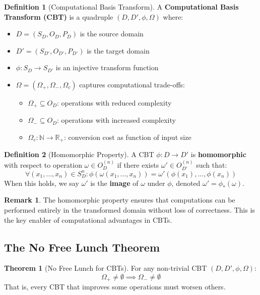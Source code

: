 \documentclass[12pt,a4paper]{article}
\theoremstyle{definition}
\newtheorem{definition}{Definition}
\newtheorem{theorem}{Theorem}
\newtheorem{remark}{Remark}
\begin{document}
\begin{definition}[Computational Basis Transform]
\label{def:cbt}
A \textbf{Computational Basis Transform (CBT)} is a quadruple $(D, D', \phi, \Omega)$ where:
\begin{itemize}
\item $D = (S_D, O_D, P_D)$ is the source domain
\item $D' = (S_{D'}, O_{D'}, P_{D'})$ is the target domain
\item $\phi: S_D \to S_{D'}$ is an injective transform function
\item $\Omega = (\Omega_+, \Omega_-, \Omega_c)$ captures computational trade-offs:
  \begin{itemize}
  \item $\Omega_+ \subseteq O_D$: operations with reduced complexity
  \item $\Omega_- \subseteq O_D$: operations with increased complexity
  \item $\Omega_c: \mathbb{N} \to \mathbb{R}_+$: conversion cost as function of input size
  \end{itemize}
\end{itemize}
\end{definition}

\begin{definition}[Homomorphic Property]
A CBT $\phi: D \to D'$ is \textbf{homomorphic} with respect to operation $\omega \in O_D^{(n)}$ if there exists $\omega' \in O_{D'}^{(n)}$ such that:
\begin{equation}
\forall (x_1, \ldots, x_n) \in S_D^n: \phi(\omega(x_1, \ldots, x_n)) = \omega'(\phi(x_1), \ldots, \phi(x_n))
\end{equation}
When this holds, we say $\omega'$ is the \textbf{image} of $\omega$ under $\phi$, denoted $\omega' = \phi_*(\omega)$.
\end{definition}

\begin{remark}
The homomorphic property ensures that computations can be performed entirely in the transformed domain without loss of correctness. This is the key enabler of computational advantages in CBTs.
\end{remark}

\subsection{The No Free Lunch Theorem}

\begin{theorem}[No Free Lunch for CBTs]
\label{thm:nfl}
For any non-trivial CBT $(D, D', \phi, \Omega)$:
\begin{equation}
\Omega_+ \neq \emptyset \implies \Omega_- \neq \emptyset
\end{equation}
That is, every CBT that improves some operations must worsen others.
\end{theorem}
\end{document}

